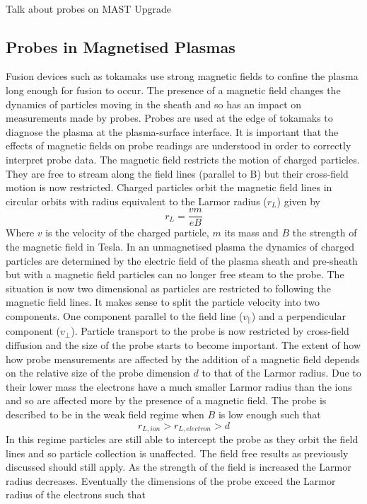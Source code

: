 \documentclass[12pt]{article}
\def\be{\begin{equation}}
\def\ee{\end{equation}}
\begin{document}
\paragraph{}
Talk about probes on MAST Upgrade 




 
\subsection{Probes in Magnetised Plasmas}
Fusion devices such as tokamaks use strong magnetic fields to confine the plasma long enough for fusion to occur. The presence of a magnetic field changes the dynamics of particles moving in the sheath and so has an impact on measurements made by probes. Probes are used at the edge of tokamaks to diagnose the plasma at the plasma-surface interface. It is important that the effects of magnetic fields on probe readings are understood in order to correctly interpret probe data.
The magnetic field restricts the motion of charged particles. They are free to stream along the field lines (parallel to B) but their cross-field motion is now restricted. Charged particles orbit the magnetic field lines in circular orbits with radius equivalent to the Larmor radius ($r_L$) given by
\be 
r_L = \frac{v m}{e B}
\ee
Where $v$ is the velocity of the charged particle, $m$ its mass and $B$ the strength of the magnetic field in Tesla.  In an unmagnetised plasma the dynamics of charged particles are determined by the electric field of the plasma sheath and pre-sheath but with a magnetic field particles can no longer free steam to the probe.
The situation is now two dimensional as particles are restricted to following the magnetic field lines. It makes sense to split the particle velocity into two components. One component parallel to the field line ($v_\parallel$) and a perpendicular component ($v_\perp$).  Particle transport to the probe is now restricted by cross-field diffusion and the size of the probe starts to become important. 
The extent of how how probe measurements are affected by the addition of a magnetic field depends on the relative size of the probe dimension $d$ to that of the Larmor radius. Due to their lower mass the electrons have a much smaller Larmor radius than the ions and so are affected more by the presence of a magnetic field. The probe is described to be in the weak field regime when $B$ is low enough such that
\be
r_{L,ion} > r_{L, electron} > d
\ee
In this regime particles are still able to intercept the probe as they orbit the field lines and so particle collection is unaffected. The field free results as previously discussed should still apply. As the strength of the field is increased the Larmor radius decreases. Eventually the dimensions of the probe exceed the Larmor radius of the electrons such that 
\end{document}
